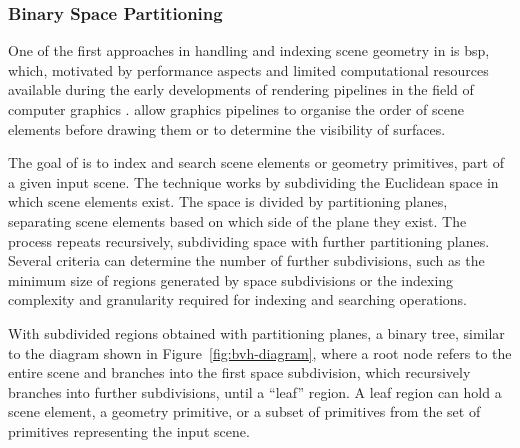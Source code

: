 \subsubsection{Binary Space Partitioning}
One of the first approaches in handling and indexing scene geometry in  is \acrfull{bsp}, which, motivated by performance aspects and limited computational resources available during the early developments of rendering pipelines in the field of computer graphics \citep{fuchs_bsp}.  allow graphics pipelines to organise the order of scene elements before drawing them or to determine the visibility of surfaces.\par
The goal of  is to index and search scene elements or geometry primitives, part of a given input scene. The technique works by subdividing the Euclidean space in which scene elements exist. The space is divided by partitioning planes, separating scene elements based on which side of the plane they exist. The process repeats recursively, subdividing space with further partitioning planes. Several criteria can determine the number of further subdivisions, such as the minimum size of regions generated by space subdivisions or the indexing complexity and granularity required for indexing and searching operations.\par
With subdivided regions obtained with partitioning planes, a binary tree, similar to the diagram shown in Figure~\ref{fig:bvh-diagram}, where a root node refers to the entire scene and branches into the first space subdivision, which recursively branches into further subdivisions, until a ``leaf'' region. A leaf region can hold a scene element, a geometry primitive, or a subset of primitives from the set of primitives representing the input scene.\par

